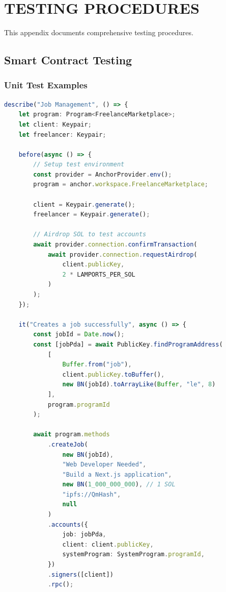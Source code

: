 \documentclass[a4paper,13pt,twoside]{report}
\theoremstyle{definition}
\begin{document}
\chapter{TESTING PROCEDURES}
\label{appendix:testing}

This appendix documents comprehensive testing procedures.

\section{Smart Contract Testing}

\subsection{Unit Test Examples}

\begin{lstlisting}[language=TypeScript]
describe("Job Management", () => {
    let program: Program<FreelanceMarketplace>;
    let client: Keypair;
    let freelancer: Keypair;

    before(async () => {
        // Setup test environment
        const provider = AnchorProvider.env();
        program = anchor.workspace.FreelanceMarketplace;

        client = Keypair.generate();
        freelancer = Keypair.generate();

        // Airdrop SOL to test accounts
        await provider.connection.confirmTransaction(
            await provider.connection.requestAirdrop(
                client.publicKey,
                2 * LAMPORTS_PER_SOL
            )
        );
    });

    it("Creates a job successfully", async () => {
        const jobId = Date.now();
        const [jobPda] = await PublicKey.findProgramAddress(
            [
                Buffer.from("job"),
                client.publicKey.toBuffer(),
                new BN(jobId).toArrayLike(Buffer, "le", 8)
            ],
            program.programId
        );

        await program.methods
            .createJob(
                new BN(jobId),
                "Web Developer Needed",
                "Build a Next.js application",
                new BN(1_000_000_000), // 1 SOL
                "ipfs://QmHash",
                null
            )
            .accounts({
                job: jobPda,
                client: client.publicKey,
                systemProgram: SystemProgram.programId,
            })
            .signers([client])
            .rpc();


\end{lstlisting}
\end{document}
